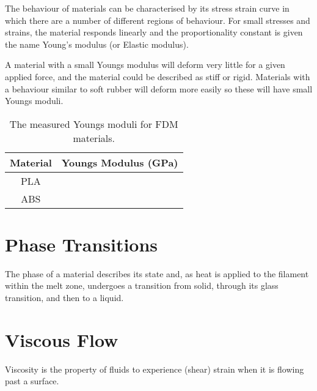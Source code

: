 The behaviour of materials can be characterised by its stress strain curve in which there are a number of different regions of behaviour. For small stresses and strains, the material responds linearly and the proportionality constant is given the name Young's modulus (or Elastic modulus). 

A material with a small Youngs modulus will deform very little for a given applied force, and the material could be described as stiff or rigid. Materials with a behaviour similar to soft rubber will deform more easily so these will have small Youngs moduli. 

\begin{table}[h]
\footnotesize%
\begin{center}
\begin{tabular}{cc}
\toprule
Material & Youngs Modulus (GPa) \\
\midrule
PLA & \\
ABS & \\
\bottomrule
\end{tabular}
\end{center}
\caption{The measured Youngs moduli for FDM materials. }
\label{tab:youngs_moduli}
\end{table}


\section{Phase Transitions}

The phase of a material describes its state and, as heat is applied to the filament within the melt zone, undergoes a transition from solid, through its glass transition, and then to a liquid. 


\section{Viscous Flow}

Viscosity is the property of fluids to experience (shear) strain when it is flowing past a surface. 
